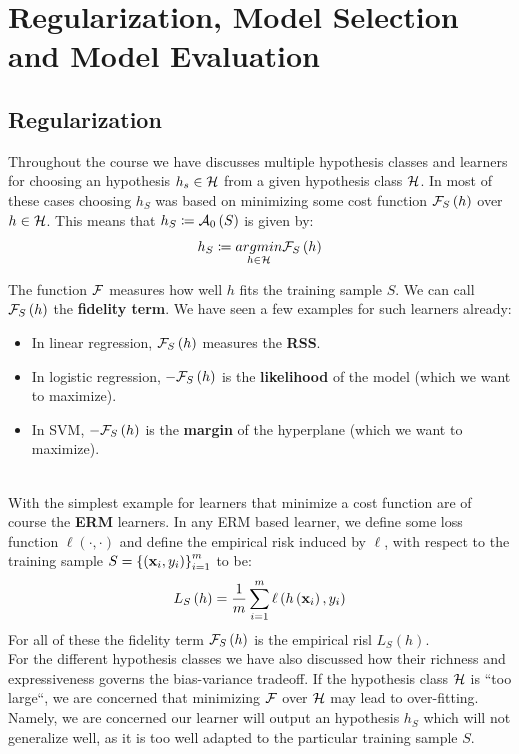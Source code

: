 \chapter{Regularization, Model Selection and Model Evaluation}
\section{Regularization}\label{chap:regularization}

Throughout the course we have discusses multiple hypothesis classes and learners for choosing an hypothesis $h_s\in\mathcal{H}$ from a given hypothesis class $\mathcal{H}$. In most of these cases choosing $h_S$ was based on minimizing some cost function $\mathcal{F}_S\left(h\right)$ over $h\in\mathcal{H}$. This means that $h_S\coloneqq\mathcal{A}_0\left(S\right)$ is given by: $$ h_S\coloneqq\underset{h\in\mathcal{H}}{argmin} \mathcal{F}_S\left(h\right) $$

The function $\mathcal{F}$ measures how well $h$ fits the training sample $S$. We can call $\mathcal{F}_S\left(h\right)$ the \textbf{fidelity term}. We have seen a few examples for such learners already:
\begin{itemize}
	\item In linear regression, $\mathcal{F}_S\left(h\right)$ measures the \textbf{RSS}.
	\item In logistic regression, $-\mathcal{F}_S\left(h\right)$ is the \textbf{likelihood} of the model (which we want to maximize).
	\item In SVM, $-\mathcal{F}_S\left(h\right)$ is the \textbf{margin} of the hyperplane (which we want to maximize).
\end{itemize}
~\\
With the simplest example for learners that minimize a cost function are of course the \textbf{ERM} learners. In any ERM based learner, we define some loss function $\ell\left(\cdot,\cdot\right)$ and define the empirical risk induced by $\ell$, with respect to the training sample $S=\left\{\left(\mathbf{x}_i,y_i\right)\right\}^m_{i=1}$ to be: $$ L_S\left(h\right)=\frac{1}{m}\sum^m_{i=1}\ell\left(h\left(\mathbf{x}_i\right),y_i\right) $$
For all of these the fidelity term $\mathcal{F}_S\left(h\right)$ is the empirical risl $L_S\left(h\right)$. ~\\

For the different hypothesis classes we have also discussed how their richness and expressiveness governs the bias-variance tradeoff. If the hypothesis class $\mathcal{H}$ is ``too large``, we are concerned that minimizing $\mathcal{F}$ over $\mathcal{H}$ may lead to over-fitting. Namely, we are concerned our learner will output an hypothesis $h_S$ which will not generalize well, as it is too well adapted to the particular training sample $S$.~\\

